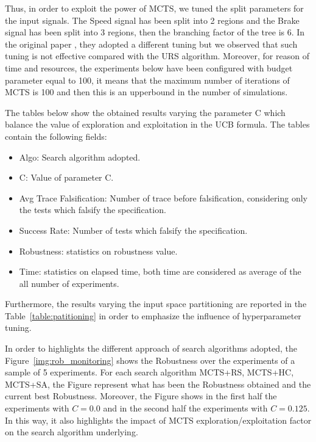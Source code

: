 \documentclass[11pt]{article}
\begin{document}
Thus, in order to exploit the power of MCTS, we tuned the split parameters for the input signals. The Speed signal has been split into 2 regions and the Brake signal has been split into 3 regions, then the branching factor of the tree is 6. In the original paper \cite{zhang2018two}, they
adopted a different tuning but we observed that such tuning is not effective compared with the URS algorithm. Moreover, for reason of time and resources, the experiments below have been configured with budget parameter equal to 100, it means that the maximum number of iterations of MCTS is 100 and then this is an upperbound in the number of simulations.

The tables below show the obtained results varying the parameter C which balance the value of exploration and exploitation in the UCB formula. The tables contain the following fields:
\begin{itemize}
    \item Algo: Search algorithm adopted.
    \item C: Value of parameter C.
    \item Avg Trace Falsification: Number of trace before falsification, considering only the tests which falsify the specification.
    \item Success Rate: Number of tests which falsify the specification.
    \item Robustness: statistics on robustness value.
    \item Time: statistics on elapsed time, both time are considered as average of the all number of experiments.
\end{itemize}

Furthermore, the results varying the input space partitioning are reported in the Table~\ref{table:patitioning} in order to emphasize the influence of hyperparameter tuning.

In order to highlights the different approach of search algorithms adopted, the Figure~\ref{img:rob_monitoring} shows the Robustness over the experiments of a sample of 5 experiments. For each search algorithm MCTS+RS, MCTS+HC, MCTS+SA, the Figure represent what has been the Robustness obtained and the current best Robustness. Moreover, the Figure shows in the first half the experiments with $C=0.0$ and in the second half the experiments with $C=0.125$. In this way, it also highlights the impact of MCTS exploration/exploitation factor on the search algorithm underlying.
\end{document}
